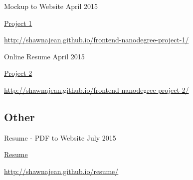 \documentclass[]{friggeri-cv} %
\begin{document}
\begin{entrylist}
\entry
{Mockup to Website}
{April 2015}{}
{\href{https://github.com/shawnajean/frontend-nanodegree-project-1}{\Github \hspace{.5 mm} Project 1}

\href{http://shawnajean.github.io/frontend-nanodegree-project-1/}{\Link \hspace{.5 mm} http://shawnajean.github.io/frontend-nanodegree-project-1/}

\fontsize{9pt}{11pt}
}
\entry
{Online Resume}
{April 2015}{}
{\href{https://github.com/shawnajean/frontend-nanodegree-project-2}{\Github \hspace{.5 mm} Project 2}

\href{http://shawnajean.github.io/frontend-nanodegree-project-2/}{\Link \hspace{.5 mm} http://shawnajean.github.io/frontend-nanodegree-project-2/}

\fontsize{9pt}{11pt}
}

\end{entrylist}
\vspace{-1.5\parskip}
\subsection
{Other}{}

\begin{entrylist}
\entry
{Resume - PDF to Website}
{July 2015}{}
{\href{https://github.com/shawnajean/resume}{\Github \hspace{.5 mm} Resume}

\href{http://shawnajean.github.io/resume/}{\Link \hspace{.5 mm} http://shawnajean.github.io/resume/}

\fontsize{9pt}{11pt}
}
\end{entrylist}
\vspace{-1.5\parskip}
\end{document}

